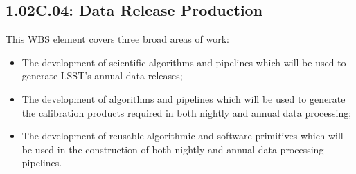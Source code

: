 \subsection*{1.02C.04: Data Release Production}

This WBS element covers three broad areas of work:

\begin{itemize}

  \item{The development of scientific algorithms and pipelines which will be
  used to generate LSST's annual data releases;}

  \item{The development of algorithms and pipelines which will be used to
  generate the calibration products required in both nightly and annual data
  processing;}

  \item{The development of reusable algorithmic and software primitives which
  will be used in the construction of both nightly and annual data processing
  pipelines.}

\end{itemize}
